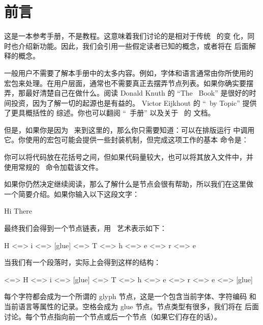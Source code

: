 \chapter{前言}\label{preamble}

\topicindex{\LUA}

这是一本参考手册，不是教程。这意味着我们讨论的是相对于传统 \TEX\ 的变
化，同时也介绍新功能。因此，我们会引用一些假定读者已知的概念，或者将在
后面解释的概念。

一般用户不需要了解本手册中的太多内容。例如，字体和语言通常由你所使用的
宏包来处理。在用户层面，通常也不需要真正去摆弄节点列表。如果你确实要摆
弄，那最好清楚自己在做什么。阅读 Donald Knuth 的 ``The
\TEX\ Book'' 是很好的时间投资，因为了解一切的起源也是有益的。
Victor Eijkhout 的 ``\TEX\ by Topic'' 提供了更具概括性的
综述。你也可以翻阅 ``\ETEX\ 手册'' 以及关于 \PDFTEX\ 的
文档。

但是，如果你是因为 \LUA\ 来到这里的，那么你只需要知道：可以在排版运行
中调用它。你使用的宏包可能会提供一些封装机制，但完成这项工作的基本
 命令是：

\begin{typing}
\end{typing}

你可以将代码放在花括号之间，但如果代码量较大，也可以将其放入文件中，并
使用常规的 \LUA\ 命令加载该文件。

如果你仍然决定继续阅读，那么了解什么是节点会很有帮助，所以我们在这里做
一个简要介绍。如果你输入以下这段文字：

\begin{typing}
Hi There
\end{typing}

最终我们会得到一个节点链表，用 \ASCII\ 艺术表示如下：

\begin{typing}
H <=> i <=> [glue] <=> T <=> h <=> e <=> r <=> e
\end{typing}

当我们有一个段落时，实际上会得到这样的结构：

\begin{typing}
[localpar] <=> H <=> i <=> [glue] <=> T <=> h <=> e <=> r <=> e <=> [glue]
\end{typing}

每个字符都会成为一个所谓的 glyph 节点，这是一个包含当前字体、字符编码
和当前语言等属性的记录。空格会成为 glue 节点。节点类型有很多，我们将在
后面讨论。每个节点指向前一个节点或后一个节点（如果它们存在的话）。

